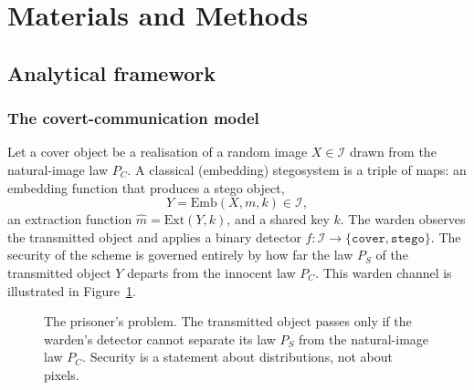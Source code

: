 \documentclass[10pt,a4paper]{article}
\theoremstyle{definition}
\begin{document}

\section{Materials and Methods}\label{sec:method}
\subsection{Analytical framework}\label{sec:framework}
\subsubsection{The covert-communication model}\label{sec:model}
Let a cover object be a realisation of a random image $X\in\mathcal{I}$ drawn from
the natural-image law $P_C$. A classical (embedding) stegosystem is a triple of
maps: an embedding function that produces a stego object,
\begin{equation}
  Y=\mathrm{Emb}(X,m,k)\in\mathcal{I},
  \label{eq:emb}
\end{equation}
an extraction function $\hat m=\mathrm{Ext}(Y,k)$, and a shared key $k$. The warden
observes the transmitted object and applies a binary detector
$f:\mathcal{I}\to\{\texttt{cover},\texttt{stego}\}$. The security of the scheme is
governed entirely by how far the law $P_S$ of the transmitted object $Y$ departs
from the innocent law $P_C$. This warden channel is illustrated in
Figure~\ref{fig:warden}.

\begin{figure}[t]
\centering
{}
\caption{The prisoner's problem. The transmitted object passes only if the warden's
detector cannot separate its law $P_S$ from the natural-image law $P_C$. Security is
a statement about distributions, not about pixels.}
\label{fig:warden}
\end{figure}
\end{document}
